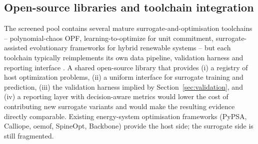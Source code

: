 \subsection{Open-source libraries and toolchain integration}
\label{sec:ch:tooling}

The screened pool contains several mature surrogate-and-optimisation
toolchains -- polynomial-chaos OPF, learning-to-optimize for unit
commitment, surrogate-assisted evolutionary frameworks for hybrid
renewable systems -- but each toolchain typically reimplements its
own data pipeline, validation harness and reporting interface
\cite{Muhlpfordt20194806,Mitrovic2023__2,Mitrovic2023__3,Wu2022231,Chen20244723,Chen2022,Roth2019214,Hirvonen2017323,Schulte2020}.
A shared open-source library that provides (i) a registry of host
optimization problems, (ii) a uniform interface for surrogate
training and prediction, (iii) the validation harness implied by
Section~\ref{sec:validation}, and (iv) a reporting layer with
decision-aware metrics would lower the cost of contributing new
surrogate variants and would make the resulting evidence directly
comparable. Existing energy-system optimisation frameworks (PyPSA,
Calliope, oemof, SpineOpt, Backbone) provide the host side; the
surrogate side is still fragmented.
